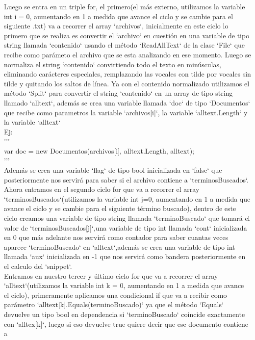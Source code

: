 \documentclass{article}
\begin{document}
 Luego se entra en un triple for, el primero(el más externo, utilizamos la variable int i = 0, aumentando en 1 a medida que 
 avance el ciclo y se cambie para el siguiente .txt) va a recorrer el array `archivos`, inicialmente en este ciclo lo primero
  que se realiza es convertir el `archivo` en cuestión en una variable de tipo string llamada `contenido` usando el método 
  `ReadAllText` de la clase `File` que recibe como parámeto el archivo que se esta analizando en ese momento. Luego 
  se normaliza el string `contenido` convirtiendo todo el texto en minúsculas, eliminando carácteres especiales,
   remplazando las vocales con tilde por vocales sin tilde y quitando los saltos de línea. Ya con el contenido 
   normalizado utilizamos el método `Split` para convertir el string `contenido` en un array de tipo string llamado 
   `alltext`, además se crea una variable llamada `doc` de tipo `Documentos` que recibe como parametros la variable 
   `archivos[i]`, la variable `alltext.Length` y la variable `alltext`\\
   Ej:\\
   '''\\
   var doc = new Documentos(archivos[i], alltext.Length, alltext);\\
   '''\\
Además se crea una variable `flag` de tipo bool inicializada en `false` que posteriormente nos servirá para 
saber si el archivo contiene a `terminosBuscados`.\\
Ahora entramos en el segundo ciclo for que va a recorrer el array `terminosBuscados`(utilizamos la variable
int j=0, aumentando en 1 a medida que avance el ciclo y se cambie para el siguiente término buscado),
dentro de este ciclo creamos una variable de tipo string llamada `terminoBuscado` que tomará 
el valor de `terminosBuscados[j]`,una variable de tipo int llamada `cont` inicializada en 0 
que más adelante nos servirá como contador para saber cuantas veces aparece `terminoBuscado`
en `alltext`,además se crea una variable de tipo int llamada `aux` inicializada en -1 que 
nos servirá como bandera posteriormente en el calculo del `snippet`.\\
Entramos en nuestro tercer y último ciclo for que va a recorrer el array `alltext`(utilizamos 
la variable int k = 0, aumentando en 1 a medida que avance el ciclo), primeramente aplicamos
una condicional if que va a recibir como parámetro `alltext[k].Equals(terminoBuscado)` ya que
el método `Equals` devuelve un tipo bool en dependencia si `terminoBuscado` coincide exactamente 
con `alltex[k]`, luego si eso devuelve true quiere decir que ese documento contiene a 
\end{document}
